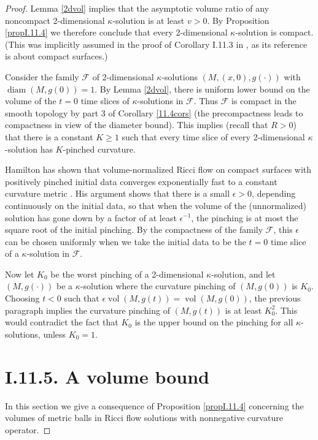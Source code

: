 \documentclass[12pt]{amsart}
\newcommand{\diam}{\operatorname{diam}}
\newcommand{\f}{{\mathcal F}}
\newcommand{\vol}{\operatorname{vol}}
\newcommand{\eps}{\epsilon}
\numberwithin{equation}{section}
\theoremstyle{plain}
\theoremstyle{definition}
\theoremstyle{remark}
\begin{document}
\begin{proof}
\bigskip
Lemma \ref{2dvol} implies that the asymptotic volume ratio of any
noncompact 2-dimensional $\kappa$-solution is at least $v>0$.
By Proposition \ref{propI.11.4}
we therefore conclude that every 2-dimensional $\kappa$-solution
is compact.  (This was implicitly assumed in the
proof of Corollary I.11.3 in \cite{Perelman}, as its reference
\cite{Hamsurface} is about compact surfaces.)

Consider the family $\f$ 
of 2-dimensional $\kappa$-solutions $(M,(x,0),g(\cdot))$
with $\diam(M,g(0))=1$.  By Lemma \ref{2dvol}, there is uniform
lower bound on the volume of the $t=0$ time slices of $\kappa$-solutions in 
$\f$. Thus $\f$  is compact in the smooth topology by part 3 of 
Corollary \ref{11.4cors}
(the precompactness leads to compactness in view of the diameter bound).
This implies 
(recall that $R > 0$) that there is a constant $K\geq 1$ such that 
every time slice of every 2-dimensional $\kappa$-solution has
$K$-pinched curvature.    

Hamilton has shown that volume-normalized Ricci 
flow on compact surfaces with positively pinched initial data
converges exponentially fast to a constant curvature metric
\cite{Hamsurface}.  
His argument shows that there is a small $\eps>0$, depending 
continuously on the initial data, so that when the volume of the 
(unnormalized) solution
has  gone down by a factor of 
at least $\eps^{-1}$,
the pinching is at most the square 
root of the initial pinching.  By the compactness of the family $\f$, 
this $\eps$ can be chosen
uniformly when we take the initial data to be the $t=0$ time slice
of a  $\kappa$-solution in $\f$.
  
Now let $K_0$ be the worst pinching of
a 2-dimensional $\kappa$-solution, and let
 $(M,g(\cdot))$ be a $\kappa$-solution where the curvature pinching of 
$(M,g(0))$ is $K_0$.  Choosing $t<0$ such that 
$\eps\vol(M,g(t))=\vol(M,g(0))$,
the previous paragraph implies the curvature pinching of $(M,g(t))$ is at
least $K_0^2$. This would
 contradict the fact that $K_0$ is the upper bound on the
pinching for all $\kappa$-solutions, unless $K_0=1$.



\section{I.11.5. A volume bound}

In this section we give a consequence of Proposition \ref{propI.11.4}
concerning the volumes of metric balls in Ricci flow solutions
with nonnegative curvature operator.


\end{proof}
\end{document}
